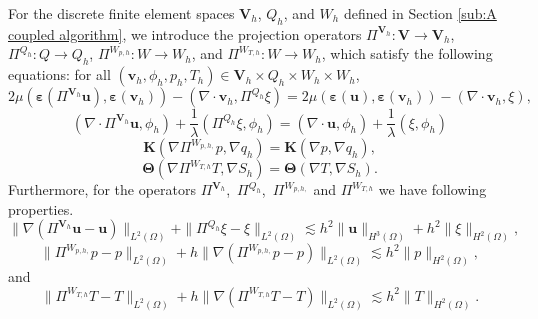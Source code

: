 \documentclass{article}
\numberwithin{equation}{section}
\begin{document}
For the discrete finite element spaces \( \bm{V}_h \), \( Q_h \), and \( W_h \) defined in Section \ref{sub:A coupled algorithm}, we introduce the projection operators \( \Pi^{\bm{V}_h}: \bm{V} \to \bm{V}_h \), \( \Pi^{Q_h}: Q \to Q_h \), \( \Pi^{W_{p,h}}: W \to W_h \), and \( \Pi^{W_{T,h}}: W \to W_h \), which satisfy the following equations: for all 
 $(\bm v_h,\phi_h,p_h,T_h)\in \bm V_h\times Q_h\times W_h\times W_h$,
\begin{equation}\label{Pi V}
   2\mu(\bm\varepsilon(\Pi^{\bm V_h}\bm u ),\bm\varepsilon( \bm v_h ))
   - (\nabla\cdot\bm v_h,\Pi^{Q_h} \xi)=2\mu(\bm\varepsilon( \bm u ),\bm\varepsilon( \bm v_h ))
   - (\nabla\cdot\bm v_h, \xi ), 
\end{equation} 
\begin{equation}\label{Pi Q}
 (\nabla\cdot\Pi^{\bm V_h}\bm u,\phi_h)+\frac1\lambda(\Pi^{Q_h} \xi,\phi_h)
         =(\nabla\cdot \bm u,\phi_h)+\frac1\lambda( \xi,\phi_h)
\end{equation} 
\begin{equation}\label{Pi Wp}
   \bm K(\nabla\Pi^{W_{p,h,}}p,\nabla q_h)=\bm K(\nabla p,\nabla q_h),
\end{equation} 
\begin{equation}\label{Pi WT}
   \bm \Theta(\nabla\Pi^{W_{T,h}}T,\nabla S_h)=\bm\Theta (\nabla T,\nabla S_h). 
\end{equation} 
Furthermore, for the operators $\Pi^{\bm V_h}$,~$\Pi^{Q_h} $,~$\Pi^{W_{p,h,}}$ and $\Pi^{W_{T,h}}$ we have following
 properties. 
\begin{equation}\label{Pi V Q properties}
   \|\nabla(\Pi^{\bm V_h}\bm u-\bm u)\|_{L^2(\Omega)}+\|\Pi^{Q_h} \xi-\xi\|_{L^2(\Omega)}
   \lesssim h^2\|\bm u\|_{H^3(\Omega)}+h^2\|\xi\|_{H^2(\Omega)}, 
\end{equation} 
\begin{equation}\label{Pi Wp properties}
   \| \Pi^{W_{p,h,}}p-p \|_{L^2(\Omega)}+h\|\nabla(\Pi^{W_{p,h,}}p-p)\|_{L^2(\Omega)}
   \lesssim h^2 \|p\|_{H^2(\Omega)},
\end{equation} 
and
\begin{equation}\label{Pi WT properties}
     \| \Pi^{W_{T,h}}T-T \|_{L^2(\Omega)}+h\|\nabla(\Pi^{W_{T,h}}T-T)\|_{L^2(\Omega)}
   \lesssim h^2 \|T\|_{H^2(\Omega)}.
\end{equation} 
 
\end{document}
